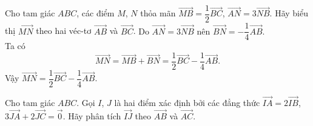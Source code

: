 \begin{bt}%
Cho tam giác $ABC$, các điểm $M$, $N$ thỏa mãn $\overrightarrow{MB}=\dfrac{1}{2}\overrightarrow{BC}$, $\overrightarrow{AN}=3\overrightarrow{NB}$. Hãy biểu thị $\overrightarrow{MN}$ theo hai véc-tơ $\overrightarrow{AB}$ và $\overrightarrow{BC}$.
\loigiai
{Do $\overrightarrow{AN}=3\overrightarrow{NB}$ nên $\overrightarrow{BN}=-\dfrac{1}{4}\overrightarrow{AB}$.\\
Ta có 
\[\overrightarrow{MN}=\overrightarrow{MB}+\overrightarrow{BN}=\dfrac{1}{2}\overrightarrow{BC}-\dfrac{1}{4}\overrightarrow{AB}.\]
Vậy $\overrightarrow{MN}=\dfrac{1}{2}\overrightarrow{BC}-\dfrac{1}{4}\overrightarrow{AB}$.
}
\end{bt}

\begin{bt}%
	Cho tam giác $ABC$. Gọi $I$, $J$ là hai điểm xác định bởi các đẳng thức $\overrightarrow{IA}=2\overrightarrow{IB}$, $3\overrightarrow{JA}+2\overrightarrow{JC}=\overrightarrow{0}$. Hãy phân tích $\overrightarrow{IJ}$ theo $\overrightarrow{AB}$ và $\overrightarrow{AC}$.
\end{bt}

